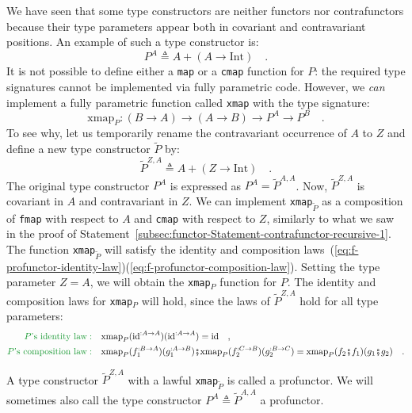 We have seen that some type constructors are neither functors nor
contrafunctors because their type parameters appear both in covariant
and contravariant positions. An example of such a type constructor
is:
\[
P^{A}\triangleq A+\left(A\rightarrow\text{Int}\right)\quad.
\]
It is not possible to define either a \lstinline!map! or a \lstinline!cmap!
function for $P$: the required type signatures cannot be implemented
via fully parametric code. However, we \emph{can} implement a fully
parametric function called \lstinline!xmap! with the type signature:
\[
\text{xmap}_{P}:\left(B\rightarrow A\right)\rightarrow\left(A\rightarrow B\right)\rightarrow P^{A}\rightarrow P^{B}\quad.
\]
To see why, let us temporarily rename the contravariant occurrence
of $A$ to $Z$ and define a new type constructor $\tilde{P}$ by:
\[
\tilde{P}^{Z,A}\triangleq A+\left(Z\rightarrow\text{Int}\right)\quad.
\]
The original type constructor $P^{A}$ is expressed as $P^{A}=\tilde{P}^{A,A}$.
Now, $\tilde{P}^{Z,A}$ is covariant in $A$ and contravariant in
$Z$. We can implement \lstinline!xmap!$_{\tilde{P}}$ as a composition
of \lstinline!fmap! with respect to $A$ and \lstinline!cmap! with
respect to $Z$, similarly to what we saw in the proof of Statement~\ref{subsec:functor-Statement-contrafunctor-recursive-1}.
The function \lstinline!xmap!$_{\tilde{P}}$ will satisfy the identity
and composition laws~(\ref{eq:f-profunctor-identity-law})\textendash (\ref{eq:f-profunctor-composition-law}).
Setting the type parameter $Z=A$, we will obtain the \lstinline!xmap!$_{P}$
function for $P$. The identity and composition laws for \lstinline!xmap!$_{P}$
will hold, since the laws of $\tilde{P}^{Z,A}$ hold for all type
parameters:
\begin{align*}
{\color{greenunder}P\text{\textsf{'}s identity law}:}\quad & \text{xmap}_{P}(\text{id}^{:A\rightarrow A})(\text{id}^{:A\rightarrow A})=\text{id}\quad,\\
{\color{greenunder}P\text{\textsf{'}s composition law}:}\quad & \text{xmap}_{P}(f_{1}^{:B\rightarrow A})(g_{1}^{:A\rightarrow B})\bef\text{xmap}_{P}(f_{2}^{:C\rightarrow B})(g_{2}^{:B\rightarrow C})=\text{xmap}_{P}(f_{2}\bef f_{1})(g_{1}\bef g_{2})\quad.
\end{align*}

A type constructor $\tilde{P}^{Z,A}$ with a lawful \lstinline!xmap!$_{\tilde{P}}$
is called a profunctor. We will sometimes also
call the type constructor $P^{A}\triangleq\tilde{P}^{A,A}$ a profunctor.

